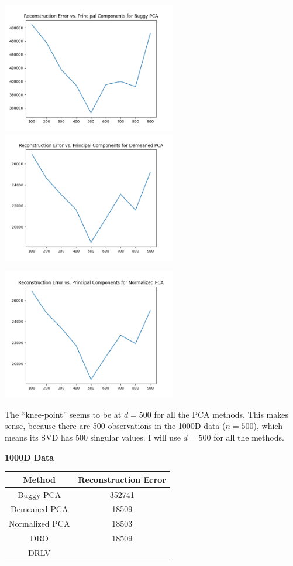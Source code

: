 \begin{itemize}
\begin{soln}
  \includegraphics[width=3in]{../figs/buggy_error_curve.png} \hspace{0.1in}
  \includegraphics[width=3in]{../figs/demeaned_error_curve.png} \\
  \begin{center}
    \includegraphics[width=3in]{../figs/normalized_error_curve.png}
  \end{center} 

  The ``knee-point'' seems to be at $d = 500$ for all the PCA methods.
  This makes sense, because there are 500 observations in the 1000D data ($n=500$), which means its SVD has 500 singular values.
  I will use $d=500$ for all the methods.

  \begin{center}
    \textbf{1000D Data} \\
    \begin{tabular}{ c  c }
      \hline
      Method & Reconstruction Error \\ \hline
      Buggy PCA & 352741 \\
      Demeaned PCA & 18509 \\
      Normalized PCA & 18503 \\
      DRO & 18509 \\
      DRLV & \\
      \hline
    \end{tabular}
  \end{center}
\end{soln}


\end{itemize}
